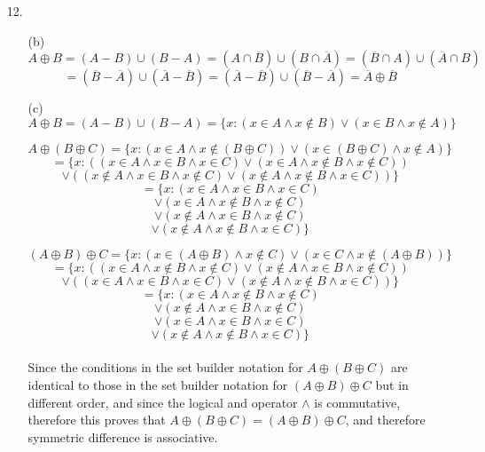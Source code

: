 \documentclass{article}
\begin{document}
\begin{enumerate}
	\item[12.]
		\begin{enumerate}
			\item[(b)]
				\[A \oplus B = (A-B) \cup (B-A) = (A \cap \overline{B}) \cup (B \cap \overline{A}) = (\overline{B} \cap A) \cup (\overline{A} \cap B)\]
				\[= (\overline{B} - \overline{A}) \cup (\overline{A} - \overline{B}) = (\overline{A} - \overline{B}) \cup (\overline{B} - \overline{A}) = \overline{A} \oplus \overline{B}\]
			
			\item[(c)]
				\[A \oplus B = (A-B) \cup (B-A) = \{x : (x \in A \land x \notin B) \lor (x \in B \land x \notin A)\}\]
				
				\[A \oplus (B \oplus C) = \{x: (x \in A \land x \notin (B \oplus C)) \lor (x \in (B \oplus C) \land x \notin A)\}\]
				\[= \{x : ((x \in A \land x \in B \land x \in C) \lor (x \in A \land x \notin B \land x \notin C))\]
				\[\lor ((x \notin A \land x \in B \land x \notin C) \lor (x \notin A \land x \notin B \land x \in C)) \}\]
				\[= \{x : (x \in A \land x \in B \land x \in C)\]
				\[\lor (x \in A \land x \notin B \land x \notin C)\]
				\[\lor (x \notin A \land x \in B \land x \notin C)\]
				\[\lor (x \notin A \land x \notin B \land x \in C)\}\]

				\[(A \oplus B) \oplus C = \{x : (x \in (A \oplus B) \land x \notin C) \lor (x \in C \land x \notin (A \oplus B))\}\]
				\[= \{x : ((x \in A \land x \notin B \land x \notin C) \lor (x \notin A \land x \in B \land x \notin C))\]
				\[\lor ((x \in A \land x \in B \land x \in C) \lor (x \notin A \land x \notin B \land x \in C))\}\]
				\[= \{x : (x \in A \land x \notin B \land x \notin C)\]
				\[\lor (x \notin A \land x \in B \land x \notin C)\]
				\[\lor (x \in A \land x \in B \land x \in C)\]
				\[\lor (x \notin A \land x \notin B \land x \in C)\}\]
				
				\paragraph{}
				Since the conditions in the set builder notation for \(A \oplus (B \oplus C)\) are identical to those in the set builder notation for \((A \oplus B) \oplus C\) but in different order, and since the logical and operator \(\land\) is commutative, therefore this proves that \(A \oplus (B \oplus C) = (A \oplus B) \oplus C \), and therefore symmetric difference is associative.
				

\end{enumerate}
\end{enumerate}
\end{document}
